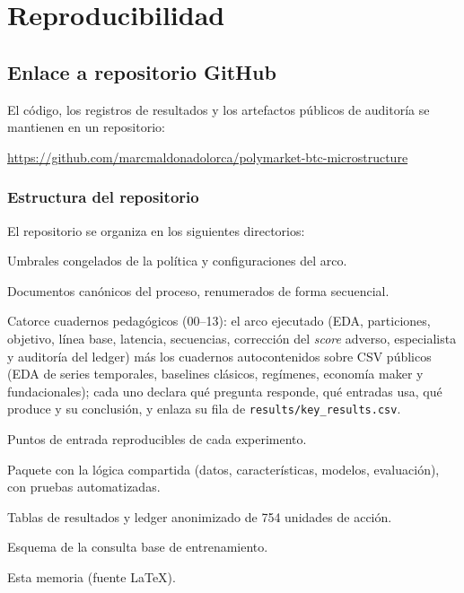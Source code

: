 %
\chapter{Reproducibilidad}
\label{ch::reproducibilidad}

\section{Enlace a repositorio GitHub}

El código, los registros de resultados y los artefactos públicos de auditoría se mantienen en
un repositorio:

\begin{center}
\url{https://github.com/marcmaldonadolorca/polymarket-btc-microstructure}
\end{center}

\subsection{Estructura del repositorio}

El repositorio se organiza en los siguientes directorios:

\begin{description}[align=right,labelwidth=2.6cm]
\item [\texttt{config/}] Umbrales congelados de la política y configuraciones del arco.
\item [\texttt{docs/}] Documentos canónicos del proceso, renumerados de forma secuencial.
\item [\texttt{notebooks/}] Catorce cuadernos pedagógicos (00--13): el arco ejecutado
(EDA, particiones, objetivo, línea base, latencia, secuencias, corrección del \emph{score}
adverso, especialista y auditoría del ledger) más los cuadernos autocontenidos sobre CSV
públicos (EDA de series temporales, baselines clásicos, regímenes, economía maker y
fundacionales); cada uno declara qué pregunta responde, qué entradas usa, qué produce y su
conclusión, y enlaza su fila de \texttt{results/key\_results.csv}.
\item [\texttt{scripts/}] Puntos de entrada reproducibles de cada experimento.
\item [\texttt{src/}] Paquete con la lógica compartida (datos, características, modelos,
evaluación), con pruebas automatizadas.
\item [\texttt{results/}] Tablas de resultados y ledger anonimizado de 754 unidades de acción.
\item [\texttt{sql/}] Esquema de la consulta base de entrenamiento.
\item [\texttt{reports/}] Esta memoria (fuente LaTeX).
\end{description}

